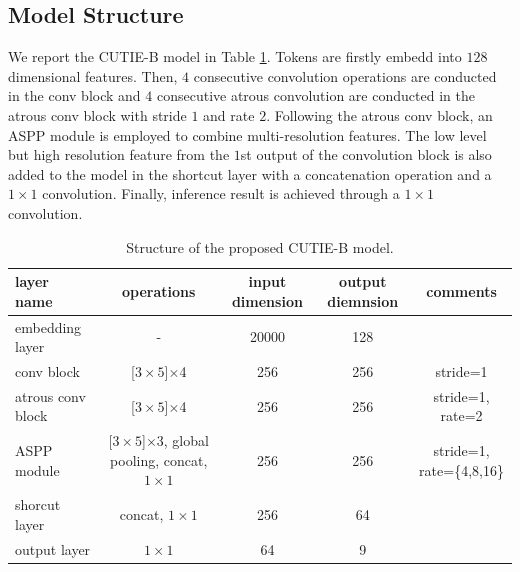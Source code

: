 \documentclass[10pt,twocolumn,letterpaper]{article}
\begin{document}
\subsection{Model Structure}
We report the CUTIE-B model in Table \ref{tab:cutie}. Tokens are firstly embedd into $128$ dimensional features. Then, $4$ consecutive convolution operations are conducted in the conv block and $4$ consecutive atrous convolution are conducted in the atrous conv block with stride $1$ and rate $2$. Following the atrous conv block, an ASPP module is employed to combine multi-resolution features. The low level but high resolution feature from the $1$st output of the convolution block is also added to the model in the shortcut layer with a concatenation operation and a $1\times1$ convolution. Finally, inference result is achieved through a $1\times1$ convolution.
\begin{table}[H]
	\caption{Structure of the proposed CUTIE-B model. }
\begin{center}
\begin{tabular}{l | c | c | c | c}
	layer name & operations & input dimension & output diemnsion & comments \\
	\hline
	embedding layer & - & 20000 & 128 & \\
	conv block & [$3\times5$]$\times$4 & 256 & 256 & stride=1 \\
	atrous conv block & [$3\times5$]$\times$4 & 256 & 256 & stride=1, rate=2 \\
	ASPP module & [$3\times5$]$\times$3, global pooling, concat, $1\times1$ & 256 & 256 & stride=1, rate=\{4,8,16\} \\
	shorcut layer & concat, $1\times1$ & 256 & 64 & \\
	output layer & $1\times1$ & 64 & 9 & \\ 
\end{tabular}
\end{center}
	\label{tab:cutie}
\end{table}
\end{document}
